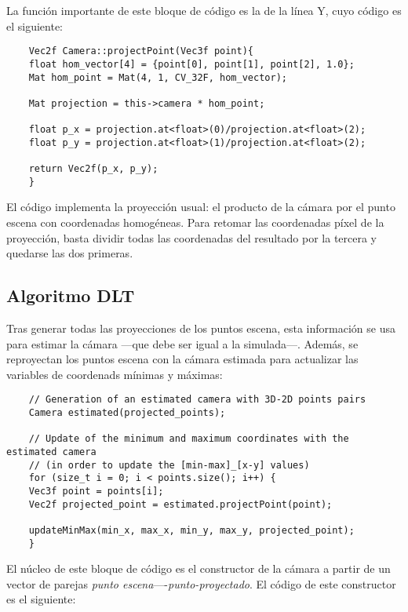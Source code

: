 \documentclass[a4paper, 11pt]{article}
\theoremstyle{definition}
\theoremstyle{theorem}
\begin{document}
    La función importante de este bloque de código es la de la línea Y, cuyo código es el siguiente:
    \begin{lstlisting}
    Vec2f Camera::projectPoint(Vec3f point){
    float hom_vector[4] = {point[0], point[1], point[2], 1.0};
    Mat hom_point = Mat(4, 1, CV_32F, hom_vector);

    Mat projection = this->camera * hom_point;

    float p_x = projection.at<float>(0)/projection.at<float>(2);
    float p_y = projection.at<float>(1)/projection.at<float>(2);

    return Vec2f(p_x, p_y);
    }
    \end{lstlisting}

    El código implementa la proyección usual: el producto de la cámara por el punto escena con coordenadas homogéneas. Para retomar las coordenadas píxel de la proyección, basta dividir todas las coordenadas del resultado por la tercera y quedarse las dos primeras.

    \subsection{Algoritmo DLT}
    Tras generar todas las proyecciones de los puntos escena, esta información se usa para estimar la cámara ---que debe ser igual a la simulada---. Además, se reproyectan los puntos escena con la cámara estimada para actualizar las variables de coordenads mínimas y máximas:

    \begin{lstlisting}
    // Generation of an estimated camera with 3D-2D points pairs
    Camera estimated(projected_points);

    // Update of the minimum and maximum coordinates with the estimated camera
    // (in order to update the [min-max]_[x-y] values)
    for (size_t i = 0; i < points.size(); i++) {
    Vec3f point = points[i];
    Vec2f projected_point = estimated.projectPoint(point);

    updateMinMax(min_x, max_x, min_y, max_y, projected_point);
    }
    \end{lstlisting}

    El núcleo de este bloque de código es el constructor de la cámara a partir de un vector de parejas \emph{punto escena}----\emph{punto-proyectado}. El código de este constructor es el siguiente:
\end{document}
